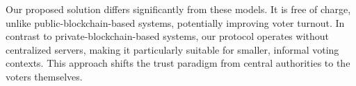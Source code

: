 \documentclass[runningheads]{llncs}
\begin{document}
Our proposed solution differs significantly from these models. It is free of charge, unlike public-blockchain-based systems, potentially improving voter turnout. In contrast to private-blockchain-based systems, our protocol operates without centralized servers, making it particularly suitable for smaller, informal voting contexts. This approach shifts the trust paradigm from central authorities to the voters themselves.


\newcommand{\fullmoon}{\tikz\filldraw[fill=black] (0,0) circle (0.5em);}
\newcommand{\newmoon}{\tikz\draw (0,0) circle (0.5em);}
\newcommand{\rightmoon}{\tikz\draw (0,0) circle (0.5em); \filldraw[fill=black] (0,0) arc (90:270:0.5em) -- cycle;}
\newcommand{\leftmoon}{\tikz\draw (0,0) circle (0.5em); \filldraw[fill=black] (0,0) arc (270:90:0.5em) -- cycle;}
\newcommand{\halfmoon}{\tikz\draw (0,0) circle (0.5em); \filldraw[fill=black] (0,-0.5em) rectangle (0,0.5em);}
\end{document}
